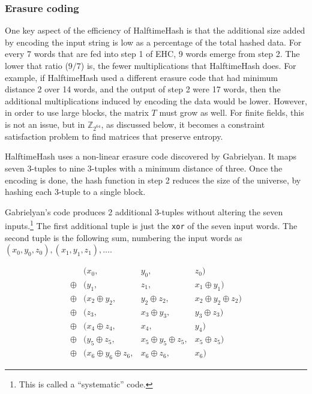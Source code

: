 \documentclass[sigconf, nonacm]{acmart}
\newcommand{\ints}{\mathbb{Z}}
\begin{document}
\subsubsection{Erasure coding}

One key aspect of the efficiency of HalftimeHash is that the additional size added by encoding the input string is low as a percentage of the total hashed data.
For every 7 words that are fed into step 1 of EHC, 9 words emerge from step 2.
The lower that ratio ($9/7$) is, the fewer multiplications that HalftimeHash does.
For example, if HalftimeHash used a different erasure code that had minimum distance 2 over 14 words, and the output of step 2 were 17 words, then the additional multiplications induced by encoding the data would be lower.
However, in order to use large blocks, the matrix $T$ must grow as well.
For finite fields, this is not an issue, but in $\ints_{2^{64}}$, as discussed below, it becomes a constraint satisfaction problem to find matrices that preserve entropy.


HalftimeHash uses a non-linear erasure code discovered by Gab\-ri\-el\-yan. \cite{9-7-erasure-code}
It maps seven 3-tuples to nine 3-tuples with a minimum distance of three.
Once the encoding is done, the hash function in step 2 reduces the size of the universe, by hashing each 3-tuple to a single block.

Gabrielyan's code produces 2 additional 3-tuples without altering the seven inputs.\footnote{This is called a ``systematic'' code.}
The first additional tuple is just the \texttt{xor} of the seven input words.
The second tuple is the following sum, numbering the input words as $(x_0, y_0, z_0), (x_1, y_1, z_1), \dots$.

\begin{displaymath}
  \begin{array}{rlcr}
       & (x_0, & y_0, & z_0)\\
\oplus & (y_1,  & z_1,  & x_1 \oplus{} y_1) \\
\oplus & (x_2 \oplus{} y_2,& y_2 \oplus{} z_2,& x_2 \oplus{} y_2 \oplus{} z_2)\\
\oplus & (z_3,    &x_3 \oplus{} y_3,& y_3 \oplus{} z_3) \\
\oplus & (x_4 \oplus{} z_4,& x_4,& y_4)\\
\oplus & (y_5 \oplus{} z_5,& x_5 \oplus{} y_5 \oplus{} z_5,& x_5\oplus{}z_5)\\
\oplus & (x_6 \oplus{} y_6 \oplus{} z_6,& x_6 \oplus{} z_6,& x_6)
  \end{array}
\end{displaymath}
\end{document}
